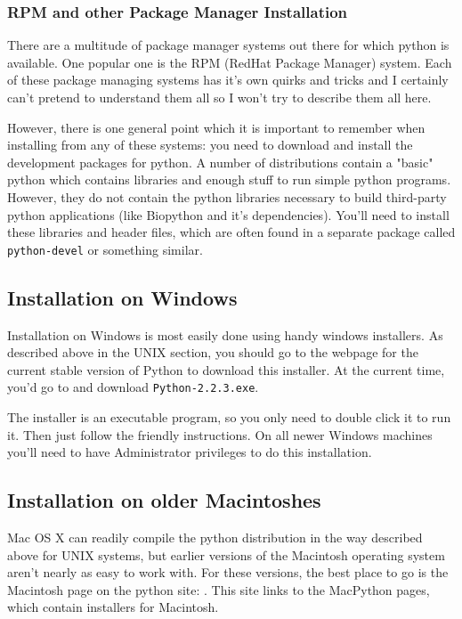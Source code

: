 \documentclass{article}
\begin{document}
\subsubsection{RPM and other Package Manager Installation}

There are a multitude of package manager systems out there for which
python is available. One popular one is the RPM (RedHat Package Manager)
system. Each of these package managing systems has it's own quirks and
tricks and I certainly can't pretend to understand them all so I won't
try to describe them all here.


However, there is one general point which it is important to remember
when installing from any of these systems: you need to download and
install the development packages for python. A number of distributions
contain a "basic" python which contains libraries and enough stuff to
run simple python programs. However, they do not contain the python
libraries necessary to build third-party python applications (like
Biopython and it's dependencies). You'll need to install these libraries
and header files, which are often found in a separate package called
\verb|python-devel| or something similar. 

\subsection{Installation on Windows} 

Installation on Windows is most easily done using handy windows
installers. As described above in the UNIX section, you should go to the
webpage for the current stable version of Python to download this
installer. At the current time, you'd go to
 and download
\verb|Python-2.2.3.exe|. 


The installer is an executable program, so you only need to double click
it to run it. Then just follow the friendly instructions. On all newer Windows
machines you'll need to have Administrator privileges to do this
installation.

\subsection{Installation on older Macintoshes}

Mac OS X can readily compile the python distribution in the way
described above for UNIX systems, but earlier versions of the Macintosh
operating system aren't nearly as easy to work with. For these versions,
the best place to go is the Macintosh page on the python site:
. This
site links to the MacPython pages, which contain installers for
Macintosh.
\end{document}
